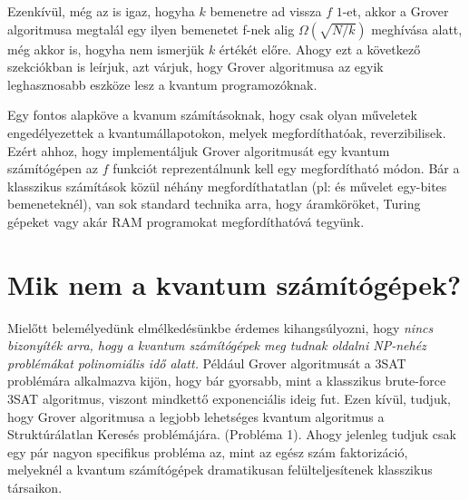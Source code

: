 \indent Ezenkívül, még az is igaz, hogyha $k$ bemenetre ad vissza $f$ $1$-et, akkor a Grover algoritmusa megtalál egy ilyen bemenetet f-nek alig $\Omega(\sqrt{N/k})$ meghívása alatt, még akkor is, hogyha nem ismerjük $k$ értékét előre.
Ahogy ezt a következő szekciókban is leírjuk, azt várjuk, hogy Grover algoritmusa az egyik leghasznosabb eszköze lesz a kvantum programozóknak.

\indent Egy fontos alapköve a kvanum számításoknak, hogy csak olyan műveletek engedélyezettek a kvantumállapotokon, melyek megfordíthatóak, reverzibilisek.
Ezért ahhoz, hogy implementáljuk Grover algoritmusát egy kvantum számítógépen az $f$ funkciót reprezentálnunk kell egy megfordítható módon.
Bár a klasszikus számítások közül néhány megfordíthatatlan (pl: és művelet egy-bites bemeneteknél), van sok standard technika arra, hogy áramköröket, Turing gépeket vagy akár RAM programokat megfordíthatóvá tegyünk.

\section{Mik nem a kvantum számítógépek?}

\hspace{2mm} Mielőtt belemélyedünk elmélkedésünkbe érdemes kihangsúlyozni, hogy \textit{nincs bizonyíték arra, hogy a kvantum számítógépek  meg tudnak oldalni NP-nehéz problémákat polinomiális idő alatt.}
Például Grover algoritmusát a 3SAT problémára alkalmazva kijön, hogy bár gyorsabb, mint a klasszikus brute-force 3SAT algoritmus, viszont mindkettő exponenciális ideig fut.
Ezen kívül, tudjuk, hogy Grover algoritmusa a legjobb lehetséges kvantum algoritmus a Struktúrálatlan Keresés problémájára. (Probléma 1).
Ahogy jelenleg tudjuk csak egy pár nagyon specifikus probléma az, mint az egész szám faktorizáció, melyeknél a kvantum számítógépek dramatikusan felülteljesítenek klasszikus társaikon.

